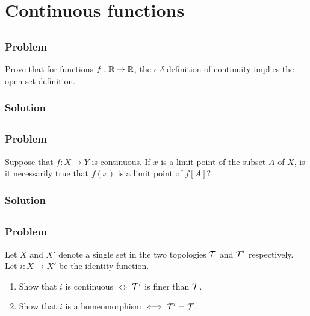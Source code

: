 \setcounter{section}{17} %
\section{Continuous functions}
\label{sec-topspace-continuous}


\subsection{}

\subsubsection{Problem}
Prove that for functions $f : \mathbb R \to \mathbb R$, the $\epsilon$-$\delta$ definition of continuity implies the open set definition.

\subsubsection{Solution}
\todo


\subsection{}

\subsubsection{Problem}
Suppose that $f : X \to Y$ is continuous. If $x$ is a limit point of the subset $A$ of $X$, is it necessarily true that $f(x)$ is a limit point of $f[A]$?

\subsubsection{Solution}
\todo


\subsection{}

\subsubsection{Problem}
Let $X$ and $X'$ denote a single set in the two topologies $\mathcal T$ and $\mathcal T'$ respectively. Let $i : X \to X'$ be the identity function. 
\begin{enumerate}
    \item Show that $i$ is continuous $\iff$ $\mathcal T'$ is finer than $\mathcal T$.
    \item Show that $i$ is a homeomorphism $\iff \mathcal T' = \mathcal T$.
\end{enumerate}

